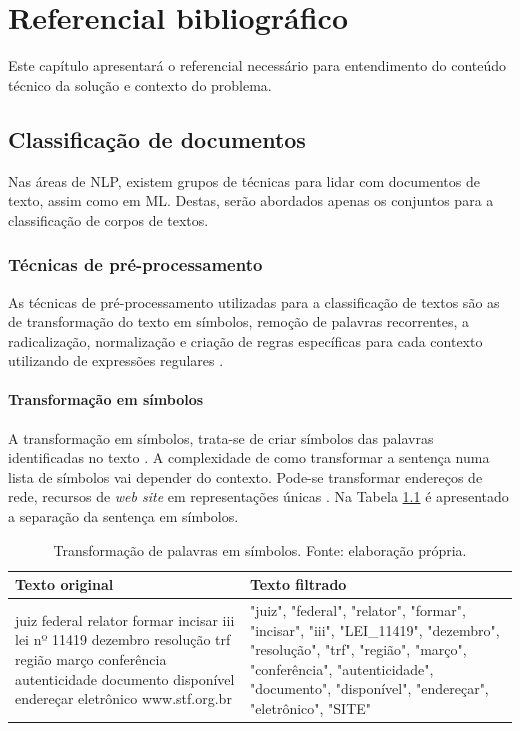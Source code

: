 \chapter[Referêncial bibliográfico]{Referencial bibliográfico}

Este capítulo apresentará o referencial necessário para entendimento do conteúdo técnico da solução e contexto do problema.
\section{Classificação de documentos}

Nas áreas de NLP, existem grupos de técnicas para lidar com documentos de texto, assim como em ML. Destas, serão abordados apenas os conjuntos para a classificação de corpos de textos.

\subsection{Técnicas de pré-processamento}
As técnicas de pré-processamento utilizadas para a classificação de textos são as de transformação do texto em símbolos, remoção de palavras recorrentes, a radicalização, normalização e criação de regras específicas para cada contexto utilizando de expressões regulares \cite{OLIVEIRA2017}.

\subsubsection{Transformação em símbolos}

A transformação em símbolos, trata-se de criar símbolos das palavras identificadas no texto \cite{MANNING2008}.
A complexidade de como transformar a sentença numa lista de símbolos vai depender do contexto. Pode-se transformar endereços de rede, recursos de \textit{web site} em representações únicas \cite{MANNING2008}. Na Tabela \ref{tab:palavrasSimbolos} é apresentado a separação da sentença em símbolos.

\begin{table}[h]
	\centering    
	\caption[Transformação de palavras em símbolos]{Transformação de palavras em símbolos. Fonte: elaboração própria.}
    \label{tab:palavrasSimbolos}
	\begin{tabular}{|p{7cm}|p{7cm}|}
    \hline
    \textbf{Texto original} & \textbf{Texto filtrado}\\ \hline
	juiz federal relator formar incisar iii lei nº 11419 dezembro resolução trf região março conferência autenticidade documento disponível endereçar eletrônico www.stf.org.br & "juiz", "federal", "relator", "formar", "incisar", "iii", "LEI\_11419", "dezembro", "resolução", "trf", "região", "março", "conferência", "autenticidade", "documento", "disponível", "endereçar", "eletrônico", "SITE"
    \\ \hline
    \end{tabular}
\end{table}

